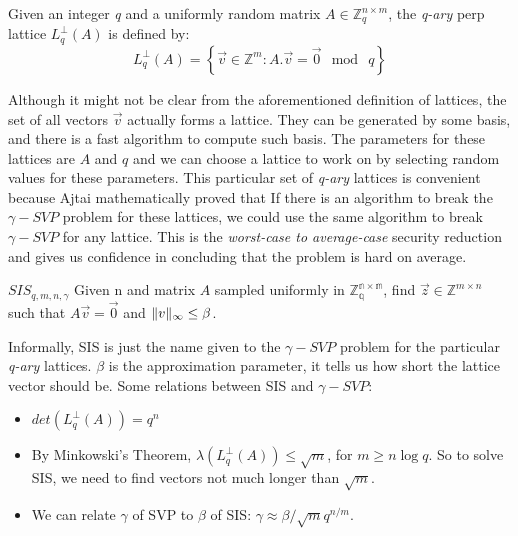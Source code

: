 \begin{definition}
  Given an integer \emph{q} and a uniformly random matrix
  $A \in \mathbb{Z}_{q}^{n \times m}$, the \emph{q-ary} perp lattice
  $L_q^\bot(A)$ is defined by:
  \[
    L_q^\bot(A) = \left\{ \vec{v} \in \mathbb{Z}^m : A.\vec{v} = \vec{0} \mod \
      q \right\}
  \]
\end{definition}
Although it might not be clear from the aforementioned definition of lattices, the set of all vectors
$\vec{v}$ actually forms a lattice. They can be generated by some basis, and
there is a fast algorithm to compute such basis. The parameters for these
lattices are $A$ and $q$ and we can choose a lattice to work on by selecting random
values for these parameters. This particular set of \emph{q-ary} lattices is convenient
because Ajtai mathematically proved that If there is an algorithm to break the
$\gamma-SVP$ problem for these lattices, we could use the same algorithm to break
$\gamma-SVP$ for any lattice. This is the \emph{worst-case to average-case}
security reduction and gives us confidence in concluding that the problem is hard on average.
\begin{definition}
  $SIS_{q,m,n,\gamma}$ Given n and matrix $A$ sampled uniformly in
  $\mathbb{Z_q^{n \times m}}$, find $\vec{z} \in \mathbb{Z}^{m \times n}$ such
  that $A\vec{v} = \vec{0}$ and $\Vert v \Vert_{\infty} \leq \beta$.
  \label{def:SISProblem}
\end{definition}
Informally, SIS is just the name given to the $\gamma-SVP$ problem for the
particular \emph{q-ary} lattices. $\beta$ is the approximation parameter, it
tells us how short the lattice vector should be. Some relations between SIS and
$\gamma-SVP$:
\begin{itemize}
\item $det(L_q^\bot(A)) = q^n$
\item By Minkowski's Theorem, $\lambda(L_q^\bot(A)) \leq \sqrt{m}$, for
  $m \geq n \log q$. So to solve SIS, we need to find vectors not much longer
  than $\sqrt{m}$.
\item We can relate $\gamma$ of SVP to $\beta$ of SIS:
  $\gamma \approx \beta/\sqrt{m}q^{n/m}$.
\end{itemize}

